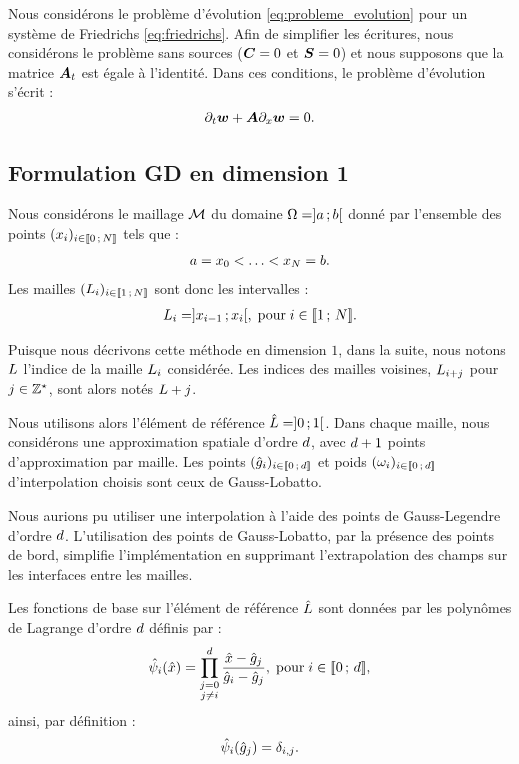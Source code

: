 Nous considérons le problème d'évolution \eqref{eq:probleme_evolution}
pour un système de Friedrichs \eqref{eq:friedrichs}.
Afin de simplifier les écritures, nous considérons le problème
sans sources ($\bm{C} = 0$ et $\bm{S} = 0$) et nous supposons
que la matrice $\bm{A}_{t}$ est égale à l’identité.
Dans ces conditions, le problème d'évolution s'écrit :
\begin{align}
	\partial_{t} \bm{w} + \bm{A} \partial_{x} \bm{w} = 0 .
\end{align}



\subsection{Formulation GD en dimension 1}
\label{ssect:formulation_gd_1-d}


Nous considérons le maillage $\mathcal{M}$ du domaine
$\Omega = \rbrack a\,;b\lbrack$ donné par l'ensemble des points
$(x_{i})_{i \in \lbrack\!\lbrack0\,;\,N\rbrack\!\rbrack}$ tels que :
\begin{align}
	a = x_{0} < \ldots < x_{N} = b .
\end{align}
Les mailles $(L_i)_{i \in \lbrack\!\lbrack1\,;\,N\rbrack\!\rbrack}$ sont donc
les intervalles :
\begin{align}
	L_i = \rbrack x_{i - 1}\,;x_{i}\lbrack ,
	\; \mathrm{pour} \; i \in \lbrack\!\lbrack1\,;\,N\rbrack\!\rbrack .
\end{align}

\begin{remark}
	Puisque nous décrivons cette méthode en dimension $1$, dans la suite,
	nous notons $L$ l'indice de la maille $L_i$ considérée.
	Les indices des mailles voisines, $L_{i + j}$ pour
	$j \in \mathbb{Z}^\star$, sont alors notés $L + j$. 
\end{remark}


Nous utilisons alors l'élément de référence $\hat{L} = \rbrack0\,;1\lbrack$.
Dans chaque maille, nous considérons une approximation spatiale
d'ordre $d$, avec $d + 1$ points d'approximation par maille.
Les points $(\hat{g}_{i})_{i \in \lbrack\!\lbrack0\,;\,d\rbrack\!\rbrack}$ et poids
$(\omega_{i})_{i \in \lbrack\!\lbrack0\,;\,d\rbrack\!\rbrack}$ d'interpolation choisis sont
ceux de Gauss-Lobatto.
\begin{remark}
	Nous aurions pu utiliser une interpolation à l'aide des points de
	Gauss-Legendre d'ordre $d$. L'utilisation des points
	de Gauss-Lobatto, par la présence des points de bord, simplifie
	l'implémentation en supprimant l'extrapolation des champs sur les
	interfaces entre les mailles.
\end{remark}
Les fonctions de base sur l'élément de référence $\hat{L}$ sont données
par les polynômes de Lagrange d'ordre $d$ définis par :
\begin{align}
	\hat{\psi}_{i}(\hat{x}) = \prod_{\substack{j=0 \\ j \neq i}}^{d}
	\frac{\hat{x} - \hat{g}_{j}}{\hat{g}_{i} - \hat{g}_{j}} ,
	\; \mathrm{pour} \; i \in \lbrack\!\lbrack0\,;\,d\rbrack\!\rbrack ,
\end{align}
ainsi, par définition :
\begin{align}
	\hat{\psi}_{i}(\hat{g}_{j}) = \delta_{i,j} .
\end{align}

